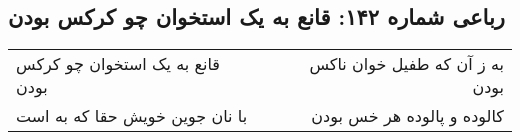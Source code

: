 \begin{center}
\section*{رباعی شماره ۱۴۲: قانع به یک استخوان چو کرکس بودن}
\label{sec:sh142}
\begin{longtable}{l p{0.5cm} r}
قانع به یک استخوان چو کرکس بودن
&&
به ز آن که طفیل خوان ناکس بودن
\\
با نان جوین خویش حقا که به است
&&
کالوده و پالوده هر خس بودن
\\
\end{longtable}
\end{center}
